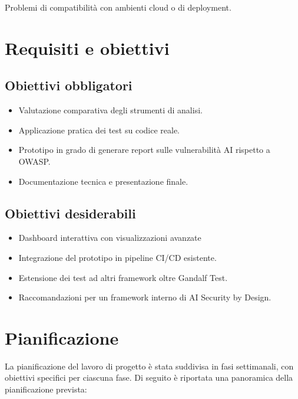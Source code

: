 \begin{risk}{Problemi di compatibilità con ambienti cloud o di deployment.}
\end{risk}


\section{Requisiti e obiettivi}


\subsection{Obiettivi obbligatori}
\begin{itemize}
\item Valutazione comparativa degli strumenti di analisi.
\item Applicazione pratica dei test su codice reale.
\item Prototipo in grado di generare report sulle vulnerabilità AI rispetto a OWASP.
\item Documentazione tecnica e presentazione finale.
\end{itemize}

\subsection{Obiettivi desiderabili}
\begin{itemize}
\item Dashboard interattiva con visualizzazioni avanzate
\item Integrazione del prototipo in pipeline CI/CD esistente.
\item Estensione dei test ad altri framework oltre Gandalf Test.
\item Raccomandazioni per un framework interno di AI Security by Design.
\end{itemize}

\section{Pianificazione}

La pianificazione del lavoro di progetto è stata suddivisa in fasi settimanali, con obiettivi specifici per ciascuna fase. Di seguito è riportata una panoramica della pianificazione prevista:

